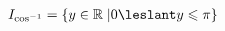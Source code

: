 \documentclass[preview]{standalone}
\begin{document}
\begin{align*}
I_{ {\cos}^{-1} } = \{ y \in \mathbb{R} \; | 0 \leslant y \leqslant \pi \}
\end{align*}
\end{document}
